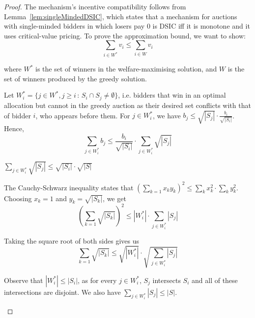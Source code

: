 			\begin{proof}
				The mechanism's incentive compatibility follows from
				Lemma~\ref{lem:singleMindedDSIC}, which states that a mechanism
				for auctions with single-minded bidders in which losers pay 0
				is DSIC iff it is monotone and it uses critical-value pricing.
				To prove the approximation bound, we want to show:
				\begin{equation*}
					\sum_{i \in W^*} v_i \le \sum_{i \in W} v_i
				\end{equation*}

				where $W^*$ is the set of winners in the welfare-maximising
				solution, and $W$ is the set of winners produced by the greedy
				solution.

				Let $W^*_i = \{ j \in W^*, j \ge i \, : \, S_i \cap S_j \neq
				\emptyset \}$, i.e. bidders that win in an optimal allocation
				but cannot in the greedy auction as their desired set conflicts
				with that of bidder $i$, who appears before them. For $j \in
				W^*_i$, we have $b_j \le \sqrt{|S_j|} \cdot
				\frac{b_i}{\sqrt{|S_i|}}$. Hence,
				\begin{equation*}
					\sum_{j \in W^*_i} b_j \le \frac{b_i}{\sqrt{|S_i|}} \cdot
					\sum_{j \in W^*_i} \sqrt{|S_j|}
				\end{equation*}

				\begin{claim}
					$\sum_{j \in W^*_i} \sqrt{|S_j|} \le \sqrt{|S_i|} \cdot
					\sqrt{|S|}$
				\end{claim}
				\begin{subproof}
					The Cauchy-Schwarz inequality states that $(\sum_{k=1} x_k
					y_k)^2 \le \sum_k x_k^2 \cdot \sum_k y_k^2$. Choosing $x_k
					= 1$ and $y_k = \sqrt{|S_k|}$, we get
					\begin{equation*}
						(\sum_{k=1} \sqrt{|S_k|})^2 \le |W^*_i| \cdot \sum_{j
						\in W^*_i} |S_j|
					\end{equation*}

					Taking the square root of both sides gives us
					\begin{equation*}
						\sum_{k=1} \sqrt{|S_k|} \le \sqrt{|W^*_i|} \cdot
						\sqrt{\sum_{j \in W^*_i} |S_j|}
					\end{equation*}

					Observe that $|W^*_i| \le |S_i|$, as for every $j \in
					W^*_i$, $S_j$ intersects $S_i$ and all of these
					intersections are disjoint. We also have $\sum_{j \in
					W^*_i} |S_j| \le |S|$.
				\end{subproof}


\end{proof}
